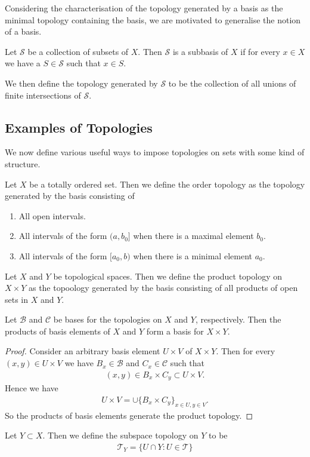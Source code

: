\documentclass[]{article}
\begin{document}
Considering the characterisation of the topology generated by a basis as the minimal topology containing the basis, we are motivated to generalise the notion of a basis.

\begin{defi} [Subbasis]
	Let $\mathcal{S}$ be a collection of subsets of $X$. Then $\mathcal{S}$ is a subbasis of $X$ if for every $x \in X$ we have a $S \in \mathcal{S}$ such that $x \in S$.


	We then define the topology generated by $\mathcal{S}$ to be the collection of all unions of finite intersections of $\mathcal{S}$.
\end{defi}

\subsection{Examples of Topologies}

We now define various useful ways to impose topologies on sets with some kind of structure.

\begin{defi} 
	Let $X$ be a totally ordered set. Then we define the order topology as the topology generated by the basis consisting of
	\begin{enumerate}
			\item All open intervals.
			\item All intervals of the form $(a,b_0]$ when there is a maximal element $b_0$.
			\item All intervals of the form $[a_0,b)$ when there is a minimal element $a_0$.
	\end{enumerate}
\end{defi}

\begin{defi} 
	Let $X$ and $Y$ be topological spaces. Then we define the product topology on $X \times Y$ as the topoology generated by the basis consisting of all products of open sets in $X$ and $Y$.		
\end{defi}

\begin{thm}
		Let $\mathcal{B}$ and $\mathcal{C}$ be bases for the topologies  on $X$ and $Y$, respectively. Then the products of basis elements of $X$ and $Y$ form a basis for $X \times Y$.
\end{thm}

\begin{proof}
		Consider an arbitrary basis element $U \times V$ of $X \times Y$. Then for every $(x,y) \in U \times V$ we have $B_x \in \mathcal{B}$ and $C_x \in \mathcal{C}$ such that
		\begin{align*}
				(x,y) \in B_x \times C_y \subset U \times V.
		\end{align*}
		Hence we have
		\begin{align*}
				U \times V = \cup \{B_x \times C_y\}_{x \in U, y \in V}.
		\end{align*}
		So the products of basis elements generate the product topology.
\end{proof}

\begin{defi} 
	Let $Y \subset X$. Then we define the subspace topology on $Y$ to be 
	\begin{align*}
			\mathcal{T}_Y = \{U \cap Y : U \in \mathcal{T}\}
	\end{align*}
\end{defi}
\end{document}
